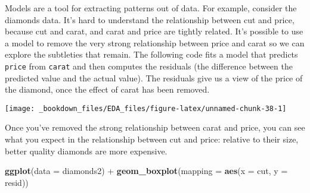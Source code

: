 \documentclass[]{book}
\newenvironment{Shaded}{\begin{snugshade}}{\end{snugshade}}
\newcommand{\KeywordTok}[1]{\textcolor[rgb]{0.13,0.29,0.53}{\textbf{{#1}}}}
\newcommand{\DataTypeTok}[1]{\textcolor[rgb]{0.13,0.29,0.53}{{#1}}}
\newcommand{\StringTok}[1]{\textcolor[rgb]{0.31,0.60,0.02}{{#1}}}
\newcommand{\NormalTok}[1]{{#1}}
\begin{document}
Models are a tool for extracting patterns out of data. For example,
consider the diamonds data. It's hard to understand the relationship
between cut and price, because cut and carat, and carat and price are
tightly related. It's possible to use a model to remove the very strong
relationship between price and carat so we can explore the subtleties
that remain. The following code fits a model that predicts
\texttt{price} from \texttt{carat} and then computes the residuals (the
difference between the predicted value and the actual value). The
residuals give us a view of the price of the diamond, once the effect of
carat has been removed.

\begin{Shaded}
\end{Shaded}

\begin{center}\texttt{[image: \_bookdown\_files/EDA\_files/figure-latex/unnamed-chunk-38-1]} \end{center}

Once you've removed the strong relationship between carat and price, you
can see what you expect in the relationship between cut and price:
relative to their size, better quality diamonds are more expensive.

\begin{Shaded}
\begin{Highlighting}[]
\KeywordTok{ggplot}\NormalTok{(}\DataTypeTok{data =} \NormalTok{diamonds2) +}\StringTok{ }
\StringTok{  }\KeywordTok{geom_boxplot}\NormalTok{(}\DataTypeTok{mapping =} \KeywordTok{aes}\NormalTok{(}\DataTypeTok{x =} \NormalTok{cut, }\DataTypeTok{y =} \NormalTok{resid))}
\end{Highlighting}
\end{Shaded}
\end{document}
